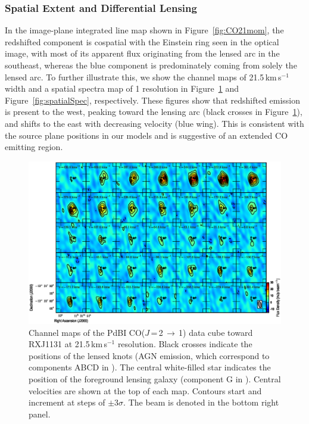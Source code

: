 \documentclass[]{emulateapj}
\newcommand{\rarr}{$\rightarrow$}
\newcommand{\bco}{\mbox{CO($J$\,=\,2\,\rarr\,1)}\xspace}
\newcommand{\kms}{\mbox{km\,s$^{-1}$}\xspace}
\newcommand{\Fig}[1]{Figure~\ref{fig:#1}}
\begin{document}
\subsubsection{Spatial Extent and Differential Lensing} \label{sec:differential}
In the image-plane integrated line map shown in \Fig{CO21mom}, the redshifted component is
cospatial with the Einstein ring seen in the
optical image, with most of its apparent flux originating from the lensed arc
in the southeast, whereas the blue component is predominately coming from
solely the lensed arc. To further illustrate this, we show the
channel maps of 21.5\,\kms width and a spatial spectra map of 1 resolution in
\Fig{chanmap} and \Fig{spatialSpec}, respectively. These figures
show that redshifted emission
is present to the west, peaking toward the lensing arc (black crosses in
\Fig{chanmap}), and shifts to the east with decreasing velocity
(blue wing).
This is consistent with the source plane positions in our models and
is suggestive of an extended CO emitting region.

\begin{figure}[!htbp]
\centering
\includegraphics[width=1.0\textwidth]{f7.eps}
\caption{
Channel maps of the PdBI \bco data cube toward RXJ1131 at 21.5\,\kms resolution.
Black crosses indicate the positions of the lensed knots (AGN emission,
which correspond to components ABCD in ). The central white-filled
star indicates the position of the foreground lensing galaxy (component G
in ).
Central velocities are shown at the top of each map.
Contours start and increment at steps of
$\pm$3$\sigma$. The beam is denoted in the bottom right panel. \label{fig:chanmap}}
\end{figure}
\end{document}
